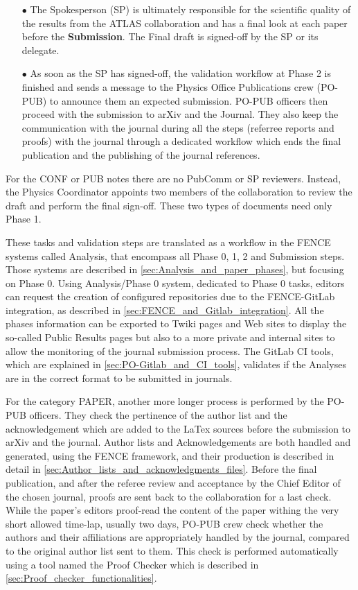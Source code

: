 \begin{itemize}
    \item[$\bullet$] The Spokesperson (SP) is ultimately responsible for the scientific quality of the results from the ATLAS collaboration and has a final look at each paper before the \textbf{Submission}. The Final draft  is signed-off by the SP or its delegate.
    
    \item[$\bullet$] As soon as the SP has signed-off, the validation workflow at Phase 2 is finished and sends a message to the Physics Office Publications crew (PO-PUB) to announce them an expected submission. PO-PUB officers then proceed with the submission to arXiv and the Journal. They also keep the communication with the journal during all the steps (referree reports and proofs) with the journal through a dedicated workflow which ends the final publication and the publishing of the journal references.
    
\end{itemize}

For the CONF or PUB notes there are no PubComm or SP reviewers. Instead, the Physics Coordinator appoints two members of the collaboration to review the draft and perform the final sign-off. These two types of documents need only Phase 1.

These tasks and validation steps are translated as a workflow in the FENCE systems called Analysis, that encompass all Phase 0, 1, 2 and Submission steps. Those systems are described in \cref{sec:Analysis_and_paper_phases}, but focusing on Phase 0. Using Analysis/Phase 0 system, dedicated to Phase 0 tasks, editors can request the creation of configured repositories due to the FENCE-GitLab integration, as described in \cref{sec:FENCE_and_Gitlab_integration}. All the phases information can be exported to Twiki pages and Web sites to display the so-called Public Results pages but also to a more private and internal sites to allow the monitoring of the journal submission process. The GitLab CI tools, which are explained in \cref{sec:PO-Gitlab_and_CI_tools}, validates if the Analyses are in the correct format to be submitted in journals.

For the category PAPER, another more longer process is performed by the PO-PUB officers. They check the pertinence of the author list and the acknowledgement which are added to the LaTex sources before the submission to arXiv and the journal. Author lists and Acknowledgements are both handled and generated, using the FENCE framework, and their production is described in detail in \cref{sec:Author_lists_and_acknowledgments_files}. Before the final publication, and after the referee review and acceptance by the Chief Editor of the chosen journal, proofs are sent back to the collaboration for a last check.  While the paper's editors proof-read the content of the paper withing the very short allowed time-lap, usually two days, PO-PUB crew check whether the authors and their affiliations are appropriately handled by the journal, compared to the original author list sent to them. This check is performed automatically using a tool named  the Proof Checker which is described in \cref{sec:Proof_checker_functionalities}.